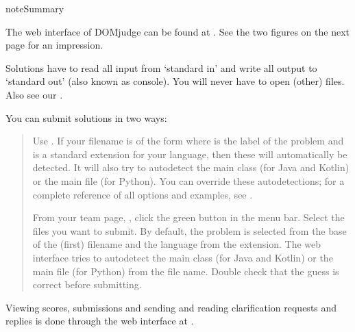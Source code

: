 \documentclass[a4paper,10pt,english,openany]{sphinxmanual}
\begin{document}
\begin{sphinxadmonition}{note}{Summary}

\sphinxAtStartPar
The web interface of DOMjudge can be found at
. See the two figures on the next page for
an impression.

\sphinxAtStartPar
Solutions have to read all input from ‘standard in’ and write all
output to ‘standard out’ (also known as console). You will never have
to open (other) files. Also see our {\hyperref[\detokenize{team:codeexamples}]{}}.

\sphinxAtStartPar
You can submit solutions in two ways:
\begin{quote}
\begin{description}
\sphinxAtStartPar
Use . If your filename is of the form
 where  is the
label of the problem and  is a standard extension for
your language, then these will automatically be detected.
It will also try to auto\sphinxhyphen{}detect the main class (for Java and Kotlin) or the
main file (for Python). You can override these auto\sphinxhyphen{}detections;
for a complete reference of all options and examples, see .

\sphinxAtStartPar
From your team page, , click the green 
button in the menu bar. Select the files you want to submit.
By default, the problem is selected from the base of the (first)
filename and the language from the extension. The web interface tries
to auto\sphinxhyphen{}detect the main class (for Java and Kotlin) or the main file (for
Python) from the file name. Double check that the guess is correct
before submitting.

\end{description}
\end{quote}

\sphinxAtStartPar
Viewing scores, submissions and sending and reading clarification
requests and replies is done through the web interface at
.
\end{sphinxadmonition}
\end{document}
